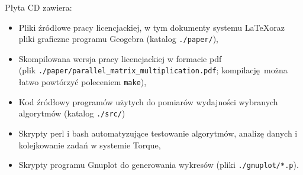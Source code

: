 Płyta CD zawiera:
\begin{itemize}
\item Pliki źródłowe pracy licencjackiej, w tym dokumenty systemu \LaTeX  oraz pliki graficzne programu Geogebra (katalog \texttt{./paper/}),
\item Skompilowana wersja pracy licencjackiej w formacie pdf\\(plik \texttt{./paper/parallel\_matrix\_multiplication.pdf}; kompilację można łatwo powtórzyć poleceniem \texttt{make}),
\item Kod źródłowy programów użytych do pomiarów wydajności wybranych algorytmów (katalog \texttt{./src/})
\item Skrypty perl i bash automatyzujące testowanie algorytmów, analizę danych i kolejkowanie zadań w systemie Torque,
\item Skrypty programu Gnuplot do generowania wykresów (pliki \texttt{./gnuplot/*.p}).
\end{itemize}